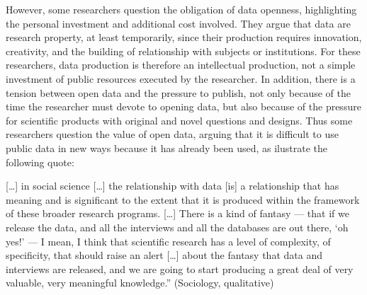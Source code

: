\documentclass[
  english,
  letterpaper,
]{article}
\begin{document}
However, some researchers question the obligation of data openness,
highlighting the personal investment and additional cost involved. They
argue that data are research property, at least temporarily, since their
production requires innovation, creativity, and the building of
relationship with subjects or institutions. For these researchers, data
production is therefore an intellectual production, not a simple
investment of public resources executed by the researcher. In addition,
there is a tension between open data and the pressure to publish, not
only because of the time the researcher must devote to opening data, but
also because of the pressure for scientific products with original and
novel questions and designs. Thus some researchers question the value of
open data, arguing that it is difficult to use public data in new ways
because it has already been used, as ilustrate the following quote:

\begin{tcolorbox}[enhanced jigsaw, opacityback=0, left=2mm, breakable, colframe=quarto-callout-color-frame, arc=.35mm, leftrule=.75mm, toprule=.15mm, bottomrule=.15mm, colback=white, rightrule=.15mm]

{[}\ldots{]} in social science {[}\ldots{]} the relationship with data
{[}is{]} a relationship that has meaning and is significant to the
extent that it is produced within the framework of these broader
research programs. {[}\ldots{]} There is a kind of fantasy --- that if
we release the data, and all the interviews and all the databases are
out there, `oh yes!' --- I mean, I think that scientific research has a
level of complexity, of specificity, that should raise an alert
{[}\ldots{]} about the fantasy that data and interviews are released,
and we are going to start producing a great deal of very valuable, very
meaningful knowledge.'' (Sociology, qualitative)

\end{tcolorbox}
\end{document}
